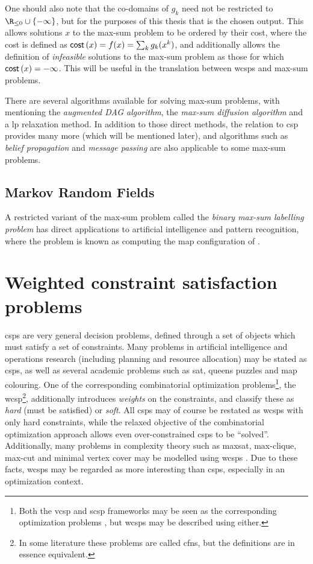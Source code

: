 One should also note that the co-domains of \(g_k\) need not be restricted to \(\Rminus \cup \{-\infty\}\), but for the purposes of this thesis that is the chosen output.
This allows solutions \(x\) to the max-sum problem to be ordered by their cost, where the cost is defined as \(\operatorname{\mathsf{cost}}\left(x\right) = f(x) = \sum_k g_k(x^k)\), and additionally allows the definition of \emph{infeasible} solutions to the max-sum problem as those for which \(\operatorname{\mathsf{cost}}\left(x\right) = -\infty\).
This will be useful in the translation between \glspl{wcsp} and max-sum problems.

There are several algorithms available for solving max-sum problems, with \textcite{Werner07} mentioning the \emph{augmented DAG algorithm}, the \emph{max-sum diffusion algorithm} and a \gls{lp} relaxation method.
In addition to those direct methods, the relation to \gls{csp} provides many more (which will be mentioned later), and algorithms such as \emph{belief propagation} and \emph{message passing} are also applicable to some max-sum problems.

\subsection{Markov Random Fields}\citereset
A restricted variant of the max-sum problem called the \emph{binary max-sum labelling problem} has direct applications to artificial intelligence and pattern recognition, where the problem is known as computing the \gls{map} configuration of  \parencite[\pno~1165]{Werner07}.

\section{Weighted constraint satisfaction problems}
\Glspl{csp} are very general decision problems, defined through a set of objects which must satisfy a set of constraints.
Many problems in artificial intelligence and operations research (including planning and resource allocation) may be stated as \glspl{csp}, as well as several academic problems such as \gls{sat}, queens puzzles and map colouring.
One of the corresponding combinatorial optimization problems\footnote{Both the \gls{vcsp} and \gls{scsp} frameworks may be seen as the corresponding optimization problems \parencites{Meseguer06}{Bistarelli99}, but \glspl{wcsp} may be described using either.}, the \gls{wcsp}\footnote{In some literature these problems are called \glspl{cfn}, but the definitions are in essence equivalent.}, additionally introduces \emph{weights} on the constraints, and classify these as \emph{hard} (must be satisfied) or \emph{soft}.
All \glspl{csp} may of course be restated as \glspl{wcsp} with only hard constraints, while the relaxed objective of the combinatorial optimization approach allows even over-constrained \glspl{csp} to be \enquote{solved}.
Additionally, many problems in complexity theory such as \gls{maxsat}, max-clique, max-cut and minimal vertex cover may be modelled using \glspl{wcsp} \parencite[\pno~315]{Meseguer06}.
Due to these facts, \glspl{wcsp} may be regarded as more interesting than \glspl{csp}, especially in an optimization context.

